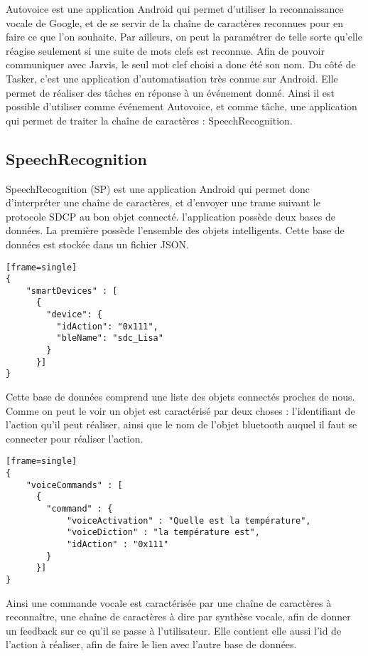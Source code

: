 Autovoice est une application Android qui permet d'utiliser la reconnaissance vocale de Google, et de se 
servir de la chaîne de caractères reconnues pour en faire ce que l'on souhaite. Par ailleurs, on peut la 
paramétrer de telle sorte qu'elle réagise seulement si une suite de mots clefs est reconnue. Afin de pouvoir 
communiquer avec Jarvis, le seul mot clef choisi a donc été son nom. Du côté de Tasker, c'est une application 
d'automatisation très connue sur Android. Elle permet de réaliser des tâches en réponse à un événement donné. 
Ainsi il est possible d'utiliser comme événement Autovoice, et comme tâche, une application qui permet de 
traiter la chaîne de caractères : SpeechRecognition.

	\subsection{SpeechRecognition}
	
SpeechRecognition (SP) est une application Android qui permet donc d'interpréter une chaîne de caractères, et 
d'envoyer une trame suivant le protocole SDCP au bon objet connecté. l'application possède deux bases de 
données. La première possède l'ensemble des objets intelligents. Cette base de données est stockée dans un 
fichier JSON.

\begin{lstlisting}[caption=Base de données des objets intelligents][frame=single]
{
    "smartDevices" : [
      {
        "device": {
          "idAction": "0x111",
          "bleName": "sdc_Lisa"
        }
      }]
}
\end{lstlisting}

Cette base de données comprend une liste des objets connectés proches de nous. Comme on peut le voir un objet 
est caractérisé par deux choses : l'identifiant de l'action qu'il peut réaliser, ainsi que le nom de l'objet 
bluetooth auquel il faut se connecter pour réaliser l'action.

\begin{lstlisting}[caption=Base de données des commandes vocales][frame=single]
{
    "voiceCommands" : [
      {
        "command" : {
            "voiceActivation" : "Quelle est la température",
            "voiceDiction" : "la température est",
            "idAction" : "0x111"
        }
      }]
}
\end{lstlisting}

Ainsi une commande vocale est caractérisée par une chaîne de caractères à reconnaître, une chaîne de 
caractères à dire par synthèse vocale, afin de donner un feedback sur ce qu'il se passe à l'utilisateur. Elle 
contient elle aussi l'id de l'action à réaliser, afin de faire le lien avec l'autre base de données.

